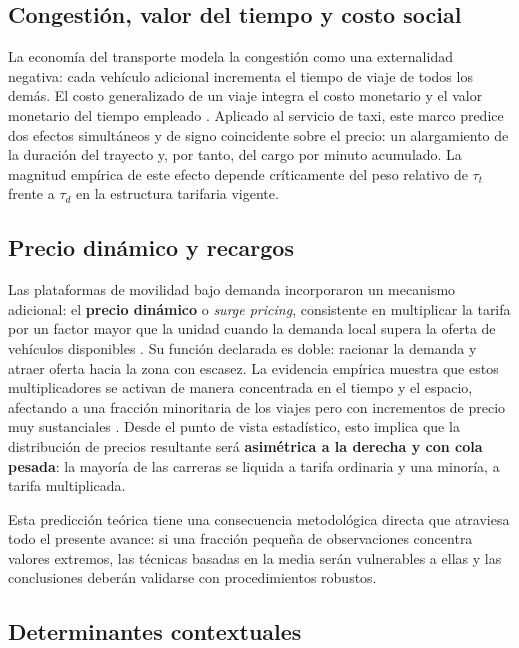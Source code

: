 \documentclass[
]{book}
\begin{document}
\subsection{Congestión, valor del tiempo y costo social}\label{congestiuxf3n-valor-del-tiempo-y-costo-social}

La economía del transporte modela la congestión como una externalidad negativa: cada vehículo
adicional incrementa el tiempo de viaje de todos los demás. El costo generalizado de un viaje
integra el costo monetario y el valor monetario del tiempo empleado \citep{small2007}. Aplicado al
servicio de taxi, este marco predice dos efectos simultáneos y de signo coincidente sobre el
precio: un alargamiento de la duración del trayecto y, por tanto, del cargo por minuto
acumulado. La magnitud empírica de este efecto depende críticamente del peso relativo de
\(\tau_t\) frente a \(\tau_d\) en la estructura tarifaria vigente.

\subsection{Precio dinámico y recargos}\label{precio-dinuxe1mico-y-recargos}

Las plataformas de movilidad bajo demanda incorporaron un mecanismo adicional: el \textbf{precio
dinámico} o \emph{surge pricing}, consistente en multiplicar la tarifa por un factor mayor que la
unidad cuando la demanda local supera la oferta de vehículos disponibles \citep{cachon2017}. Su
función declarada es doble: racionar la demanda y atraer oferta hacia la zona con escasez. La
evidencia empírica muestra que estos multiplicadores se activan de manera concentrada en el
tiempo y el espacio, afectando a una fracción minoritaria de los viajes pero con
incrementos de precio muy sustanciales \citep{chen2015}. Desde el punto de vista estadístico, esto
implica que la distribución de precios resultante será \textbf{asimétrica a la derecha y con cola
pesada}: la mayoría de las carreras se liquida a tarifa ordinaria y una minoría, a
tarifa multiplicada.

Esta predicción teórica tiene una consecuencia metodológica directa que atraviesa todo el
presente avance: si una fracción pequeña de observaciones concentra valores extremos, las
técnicas basadas en la media serán vulnerables a ellas y las conclusiones deberán validarse
con procedimientos robustos.

\subsection{Determinantes contextuales}\label{determinantes-contextuales}
\end{document}
